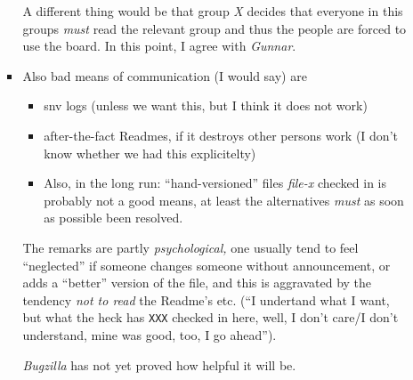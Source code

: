 \begin{itemize}
\begin{itemize}
\begin{itemize}
      A different thing would be that group \emph{X} decides that everyone in
      this groups \emph{must} read the relevant group and thus the people are
      forced to use the board. In this point, I agree with \emph{Gunnar}.
    \item Also bad means of communication (I would say) are
      \begin{itemize}
      \item snv logs (unless we want this, but I think it does not work)
      \item after-the-fact Readmes, if it destroys other persons work (I don't
        know whether we had this explicitelty)
      \item Also, in the long run: ``hand-versioned'' files \emph{file-x}
        checked in is probably not a good means, at least the alternatives
        \emph{must} as soon as possible been resolved.
      \end{itemize}
      The remarks are partly \emph{psychological,} one usually tend to feel
      ``neglected'' if someone changes someone without announcement, or adds a
      ``better'' version of the file, and this is aggravated by the tendency
      \emph{not to read} the Readme's etc. (``I undertand what I want, but
      what the heck has \texttt{XXX} checked in here, well, I don't care/I
      don't understand, mine was good, too, I go ahead'').

      \emph{Bugzilla} has not yet proved how helpful it will be.
    \end{itemize}
  \end{itemize}
\end{itemize}



%


%

